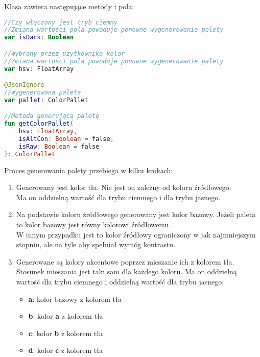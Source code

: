 \vspace{1em}

Klasa  zawiera następujące metody i pola:

\begin{lstlisting}[language=Kotlin]
//Czy włączony jest tryb ciemny
//Zmiana wartości pola powoduje ponowne wygenerowanie palety
var isDark: Boolean

//Wybrany przez użytkownika kolor
//Zmiana wartości pola powoduje ponowne wygenerowanie palety
var hsv: FloatArray

@JsonIgnore
//Wygenerowana paleta
var pallet: ColorPallet

//Metoda generującą paletę
fun getColorPallet(
    hsv: FloatArray,
    isAltCon: Boolean = false,
    isRaw: Boolean = false
): ColorPallet
\end{lstlisting}

\newpage

Proces generowania palety przebiega w kilku krokach:

\begin{enumerate}[leftmargin=*]
    \item Generowany jest kolor tła. Nie jest on zależny od koloru źródłowego.\\ Ma on oddzielną wartość dla trybu ciemnego i dla trybu jasnego.
    \item Na podstawie koloru źródłowego generowany jest kolor bazowy. Jeżeli paleta  to kolor bazowy jest równy kolorowi źródłowemu.\\
    W innym przypadku jest to kolor źródłowy ograniczony w jak najmniejszym stopniu, ale na tyle aby spełniał wymóg kontrastu.
    \item Generowane są kolory akcentowe poprzez mieszanie ich z kolorem tła. Stosunek mieszania jest taki sam dla każdego koloru. Ma on oddzielną wartość dla trybu ciemnego i oddzielną wartość dla trybu jasnego:
    \begin{itemize}[leftmargin=*]
        \item \textbf{a}: kolor bazowy z kolorem tła
        \item \textbf{b}: kolor \textbf{a} z kolorem tła
        \item \textbf{c}: kolor \textbf{b} z kolorem tła
        \item \textbf{d}: kolor \textbf{c} z kolorem tła
    \end{itemize}
\end{enumerate}

\newpage

